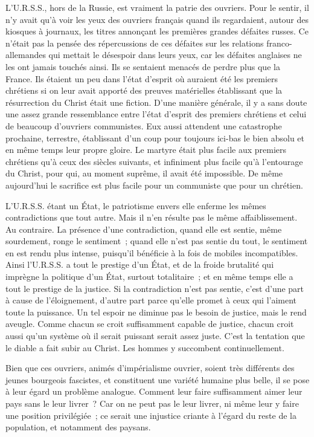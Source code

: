 \documentclass[french,twoside]{book} %
\begin{document}
L'U.R.S.S., hors de la Russie, est vraiment la patrie des ouvriers. Pour le sentir, il n'y avait qu'à voir les yeux des ouvriers français quand ils regardaient, autour des kiosques à journaux, les titres annonçant les premières grandes défaites russes. Ce n'était pas la pensée des répercussions de ces défaites sur les relations franco-allemandes qui mettait le désespoir dans leurs yeux, car les défaites anglaises ne les ont jamais touchés ainsi. Ils se sentaient menacés de perdre plus que la France. Ils étaient un peu dans l'état d'esprit où auraient été les premiers chrétiens si on leur avait apporté des preuves matérielles établissant que la résurrection du Christ était une fiction. D'une manière générale, il y a sans doute une assez grande ressemblance entre l'état d'esprit des premiers chrétiens et celui de beaucoup d'ouvriers communistes. Eux aussi attendent une catastrophe prochaine, terrestre, établissant d'un coup pour toujours ici-bas le bien absolu et en même temps leur propre gloire. Le martyre était plus facile aux premiers chrétiens qu'à ceux des siècles suivants, et infiniment plus facile qu'à l'entourage du Christ, pour qui, au moment suprême, il avait été impossible. De même aujourd'hui le sacrifice est plus facile pour un communiste que pour un chrétien.\par
L'U.R.S.S. étant un État, le patriotisme envers elle enferme les mêmes contradictions que tout autre. Mais il n'en résulte pas le même affaiblissement. Au contraire. La présence d'une contradiction, quand elle est sentie, même sourdement, ronge le sentiment ; quand elle n'est pas sentie du tout, le sentiment en est rendu plus intense, puisqu'il bénéficie à la fois de mobiles incompatibles. Ainsi l'U.R.S.S. a tout le prestige d'un État, et de la froide brutalité qui imprègne la politique d'un État, surtout totalitaire ; et en même temps elle a tout le prestige de la justice. Si la contradiction n'est pas sentie, c'est d'une part à cause de l'éloignement, d'autre part parce qu'elle promet à ceux qui l'aiment toute la puissance. Un tel espoir ne diminue pas le besoin de justice, mais le rend aveugle. Comme chacun se croit suffisamment capable de justice, chacun croit aussi qu'un système où il serait puissant serait assez juste. C'est la tentation que le diable a fait subir au Christ. Les hommes y succombent continuellement.\par
Bien que ces ouvriers, animés d'impérialisme ouvrier, soient très différents des jeunes bourgeois fascistes, et constituent une variété humaine plus belle, il se pose à leur égard un problème analogue. Comment leur faire suffisamment aimer leur pays sans le leur livrer ? Car on ne peut pas le leur livrer, ni même leur y faire une position privilégiée ; ce serait une injustice criante à l'égard du reste de la population, et notamment des paysans.\par
\end{document}
